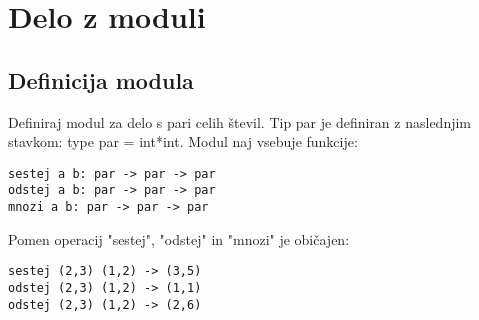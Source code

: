 \chapter{Delo z moduli}

\section{Definicija modula}


\begin{ex}
Definiraj modul za delo s pari celih \v stevil. Tip par je definiran z
naslednjim stavkom: type par = int*int. Modul naj vsebuje funkcije:

\begin{verbatim}
sestej a b: par -> par -> par
odstej a b: par -> par -> par
mnozi a b: par -> par -> par
\end{verbatim}

Pomen operacij "sestej", "odstej" in "mnozi" je obi\v cajen:
\begin{verbatim}
sestej (2,3) (1,2) -> (3,5)
odstej (2,3) (1,2) -> (1,1)
odstej (2,3) (1,2) -> (2,6)
\end{verbatim}

\end{ex}

